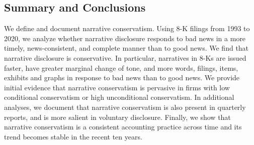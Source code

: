 \documentclass[letterpaper,12pt]{article}
\begin{document}
\begin{spacing}{1.5}
\section{Summary and Conclusions}

\noindent We define and document narrative conservatism. Using 8-K filings from 1993 to 2020, we analyze whether narrative disclosure responds to bad news in a more timely, news-consistent, and complete manner than to good news. We find that narrative disclosure is conservative. In particular, narratives in 8-Ks are issued faster, have greater marginal change of tone, and more words, filings, items, exhibits and graphs in response to bad news than to good news. We provide initial evidence that narrative conservatism is pervasive in firms with low conditional conservatism or high unconditional conservatism. In additional analyses, we document that narrative conservatism is also present in quarterly reports, and is more salient in voluntary disclosure. Finally, we show that narrative conservatism is a consistent accounting practice across time and its trend becomes stable in the recent ten years. 


\end{spacing}
\end{document}
